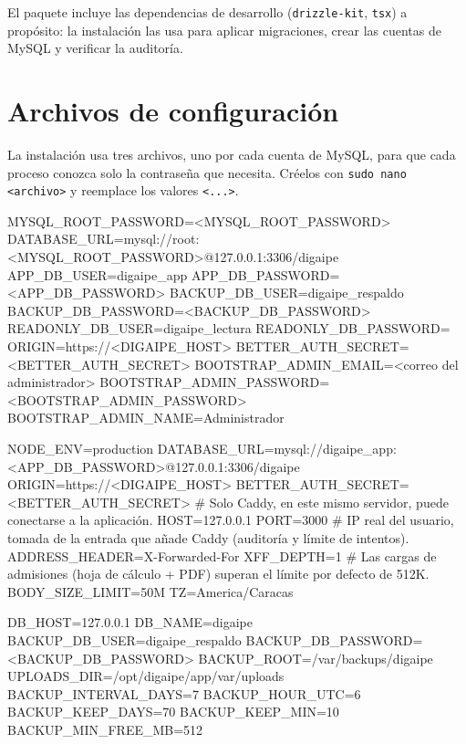 \begin{nota}
	El paquete incluye las dependencias de desarrollo (\texttt{drizzle-kit}, \texttt{tsx}) a
	propósito: la instalación las usa para aplicar migraciones, crear las cuentas de MySQL y
	verificar la auditoría.
\end{nota}

\section{Archivos de configuración}
\label{sec:linux-config}

La instalación usa tres archivos, uno por cada cuenta de MySQL, para que cada proceso conozca
solo la contraseña que necesita. Créelos con \texttt{sudo nano <archivo>} y reemplace los
valores \texttt{<...>}.

\begin{codigo}[label={/etc/digaipe/setup.env  (instalación, restauración y auditoría: root de MySQL)}]
MYSQL_ROOT_PASSWORD=<MYSQL_ROOT_PASSWORD>
DATABASE_URL=mysql://root:<MYSQL_ROOT_PASSWORD>@127.0.0.1:3306/digaipe
APP_DB_USER=digaipe_app
APP_DB_PASSWORD=<APP_DB_PASSWORD>
BACKUP_DB_USER=digaipe_respaldo
BACKUP_DB_PASSWORD=<BACKUP_DB_PASSWORD>
READONLY_DB_USER=digaipe_lectura
READONLY_DB_PASSWORD=
ORIGIN=https://<DIGAIPE_HOST>
BETTER_AUTH_SECRET=<BETTER_AUTH_SECRET>
BOOTSTRAP_ADMIN_EMAIL=<correo del administrador>
BOOTSTRAP_ADMIN_PASSWORD=<BOOTSTRAP_ADMIN_PASSWORD>
BOOTSTRAP_ADMIN_NAME=Administrador
\end{codigo}

\begin{codigo}[label={/etc/digaipe/digaipe.env  (aplicación)}]
NODE_ENV=production
DATABASE_URL=mysql://digaipe_app:<APP_DB_PASSWORD>@127.0.0.1:3306/digaipe
ORIGIN=https://<DIGAIPE_HOST>
BETTER_AUTH_SECRET=<BETTER_AUTH_SECRET>
# Solo Caddy, en este mismo servidor, puede conectarse a la aplicación.
HOST=127.0.0.1
PORT=3000
# IP real del usuario, tomada de la entrada que añade Caddy (auditoría y límite de intentos).
ADDRESS_HEADER=X-Forwarded-For
XFF_DEPTH=1
# Las cargas de admisiones (hoja de cálculo + PDF) superan el límite por defecto de 512K.
BODY_SIZE_LIMIT=50M
TZ=America/Caracas
\end{codigo}

\begin{codigo}[label={/etc/digaipe/backup.env  (respaldos)}]
DB_HOST=127.0.0.1
DB_NAME=digaipe
BACKUP_DB_USER=digaipe_respaldo
BACKUP_DB_PASSWORD=<BACKUP_DB_PASSWORD>
BACKUP_ROOT=/var/backups/digaipe
UPLOADS_DIR=/opt/digaipe/app/var/uploads
BACKUP_INTERVAL_DAYS=7
BACKUP_HOUR_UTC=6
BACKUP_KEEP_DAYS=70
BACKUP_KEEP_MIN=10
BACKUP_MIN_FREE_MB=512
\end{codigo}


